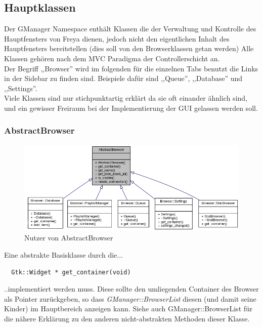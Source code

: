 \subsection{Hauptklassen}
Der GManager Namespace enthält Klassen die der Verwaltung und Kontrolle des Hauptfensters von Freya dienen,
jedoch nicht den eigentlichen Inhalt des Hauptfensters bereitstellen (dies soll von den Browserklassen getan werden)
Alle Klassen gehören nach dem MVC Paradigma der Controllerschicht an.
\\
Der Begriff ,,Browser'' wird im folgenden für die einzelnen Tabs benutzt die Links in der Sidebar zu finden sind. 
Beispiele dafür sind ,,Queue'', ,,Database'' und ,,Settings''.
\\
Viele Klassen sind nur stichpunktartig erklärt da sie oft einander ähnlich sind, und ein gewisser Freiraum bei der Implementierung der
GUI gelassen werden soll.


\subsubsection{AbstractBrowser}
\begin{figure}[htb!]
	\centering
        \includegraphics[scale=0.5]{AbstractBrowser.png}
	\caption{Nutzer von AbstractBrowser}
	\label{class_abstract_browser}
\end{figure}
Eine abstrakte Basisklasse durch die...
\begin{verbatim}
  Gtk::Widget * get_container(void) 
\end{verbatim}
..implementiert werden muss. Diese sollte den umliegenden Container des Browser als Pointer zurückgeben,
so dass \textit{GManager::BrowserList} diesen (und damit seine Kinder) im Hauptbereich anzeigen kann.
Siehe auch GManager::BrowserList für die nähere Erklärung zu den anderen nicht-abstrakten Methoden dieser Klasse.

